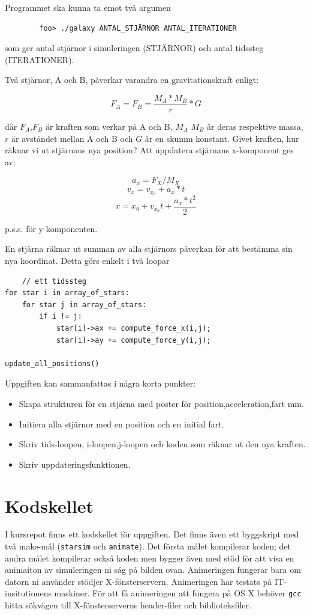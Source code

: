 \documentclass[a4paper]{article}
\begin{document}
	Programmet ska kunna ta emot två argumen

	
	\begin{verbatim}
		foo> ./galaxy ANTAL_STJÄRNOR ANTAL_ITERATIONER
	\end{verbatim}

	som ger antal stjärnor i simuleringen (STJÄRNOR) och antal tidssteg (ITERATIONER). 

	Två stjärnor, A och B, påverkar varandra en gravitationskraft enligt:

	$$ F_A = F_B = \frac{M_A*M_B}{r}*G $$

	där $F_A$,$F_B$ är kraften som verkar på A och B, $M_A$ $M_B$ är deras respektive massa, $r$ är avståndet mellan A och B och $G$ är en skumm konstant. Givet kraften, hur räknar vi ut stjärnans nya position? Att uppdatera stjärnans x-komponent ges av:

	$$a_x = F_X/M_X$$
	$$v_x = v_{x_0}+a_x*t$$
	$$x = x_{0} + v_{x_0}t+\frac{a_x*t^2}{2}$$

	p.s.s. för y-komponenten.

	En stjärna räknar ut summan av alla stjärnors påverkan för att bestämma sin nya koordinat. Detta görs enkelt i två loopar

	\begin{verbatim}
	// ett tidssteg
for star i in array_of_stars:
    for star j in array_of_stars:
        if i != j:
            star[i]->ax += compute_force_x(i,j);
            star[i]->ay += compute_force_y(i,j);

update_all_positions()
    \end{verbatim}

Uppgiften kan sammanfattas i några korta punkter:

\begin{itemize}
\item Skapa strukturen för en stjärna med poster för position,acceleration,fart mm.
\item Initiera alla stjärnor med en position och en initial fart.
\item Skriv tids-loopen, i-loopen,j-loopen och koden som räknar ut den nya kraften.
\item Skriv uppdateringsfunktionen.
\end{itemize}

\section{Kodskellet}

I kursrepot finns ett kodskellet för uppgiften. Det finns även ett byggskript
med två make-mål (\texttt{starsim} och \texttt{animate}). Det första målet
kompilerar koden; det andra målet kompilerar också koden men bygger även
med stöd för att visa en animaiton av simuleringen ni såg på bilden ovan. Animeringen fungerar bara om datorn ni använder stödjer X-fönsterservern. Animeringen har testats på IT-insitutionens maskiner. För att få animeringen att fungera på OS X behöver \texttt{gcc} hitta sökvägen till X-fönsterserverns header-filer och biblioteksfiler. 
\end{document}
